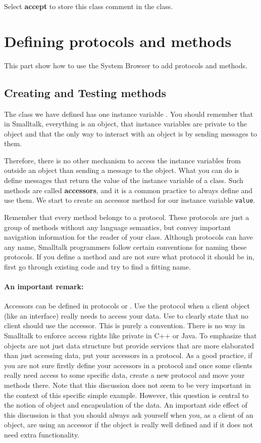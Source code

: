 Select \textbf{accept} to store this class comment in the class.


\section*{Defining protocols and methods}
This part show how to use the System Browser to add protocols
and methods. 


\subsection*{Creating and Testing methods}
The class we have defined has one instance variable . You should
remember that in Smalltalk, everything is an object, that instance variables are private to the object and  that the only way to interact with an object is by sending messages to them.

Therefore, there is no other mechanism to access the instance variables
from outside an object than sending a message to the object. What you can do is define messages that return the value of the instance variable of a class. Such methods are called \textbf{accessors}, and it is a common practice to always define and use them. We start to create an accessor method for our
instance variable \texttt{value}.

Remember that every method belongs to a protocol. These protocols are just
a group of methods without any language semantics, but convey important
navigation information for the reader of your class. Although protocols
can have any name, Smalltalk programmers follow certain conventions for
naming these protocols. If you define a method and are not sure what
protocol it should be in, first go through existing code and try to
find a fitting name.


\paragraph{An important remark:} Accessors can be defined in protocols
 or .  Use the
 protocol when a client object (like an
interface) really needs to access your data. Use 
to clearly state that no client should use the accessor. This is
purely a convention. There is no way in Smalltalk to enforce
access rights like private in C++ or Java.  To emphasize that objects are
not just data structure but provide services that are more
elaborated than just accessing data, put your accessors  in a
 protocol. As a good practice, if you are not sure
firstly define your accessors in a  protocol and
once some clients really need access to some specific data, create
a new protocol  and move your methods there. Note
that this discussion does not seem to be very important in the
context of this specific simple example. However, this question is
central to the notion of object and encapsulation of the data. An
important side effect of this discussion is that you should always
ask yourself when you, as a client of an object, are using an
accessor if the object is really well defined and if it does not
need extra functionality.

